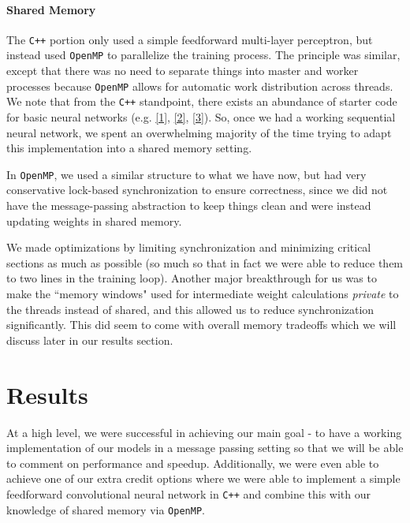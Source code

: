 \documentclass{article}
\begin{document}
\paragraph{Shared Memory}

The \texttt{C++} portion only used a simple feedforward multi-layer perceptron, but instead used \texttt{OpenMP} to parallelize the training process. The principle was similar, except that there was no need to separate things into master and worker processes because \texttt{OpenMP} allows for automatic work distribution across threads. We note that from the \texttt{C++} standpoint, there exists an abundance of starter code for basic neural networks (e.g. \href{https://github.com/Whiax/NeuralNetworkCpp/tree/master/src/neural}{[1]}, \href{https://github.com/huangzehao/SimpleNeuralNetwork/blob/master/src/neural-net.cpp}{[2]}, \href{https://github.com/arnobastenhof/mnist/tree/master/src}{[3]}). So, once we had a working sequential neural network, we spent an overwhelming majority of the time trying to adapt this implementation into a shared memory setting.

In \texttt{OpenMP}, we used a similar structure to what we have now, but had very conservative lock-based synchronization to ensure correctness, since we did not have the message-passing abstraction to keep things clean and were instead updating weights in shared memory.

We made optimizations by limiting synchronization and minimizing critical sections as much as possible (so much so that in fact we were able to reduce them to two lines in the training loop). Another major breakthrough for us was to make the ``memory windows" used for intermediate weight calculations \textit{private} to the threads instead of shared, and this allowed us to reduce synchronization significantly. This did seem to come with overall memory tradeoffs which we will discuss later in our results section.

\section{Results}

At a high level, we were successful in achieving our main goal - to have a working implementation of our models in a message passing setting so that we will be able to comment on performance and speedup. Additionally, we were even able to achieve one of our extra credit options where we were able to implement a simple feedforward convolutional neural network in \texttt{C++} and combine this with our knowledge of shared memory via \texttt{OpenMP}.
\end{document}
